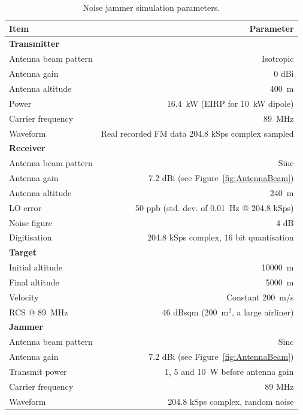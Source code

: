 \documentclass[english, 12pt]{report}
\begin{document}
\begin{table}[ht!]\label{tab:SimulationParameters}
\caption{Noise jammer simulation parameters.}

	\centering
	
	\vspace{1cm}
	\begin{tabu} to \columnwidth { X r }
  		Item 								& Parameter\\
  		\hline
  		\textbf{Transmitter} 				& \\
  		Antenna beam pattern 				& Isotropic\\
  		Antenna gain 						& 0 dBi\\
  		Antenna altitude 					& 400~m\\
  		Power 								& 16.4~kW (EIRP for 10~kW dipole)\\
  		Carrier frequency					& 89~MHz\\
  		Waveform							& Real recorded FM data 204.8 kSps complex sampled\\[3mm]
  		
  		\textbf{Receiver} 					& \\
  		Antenna beam pattern 				& Sinc\\
  		Antenna gain 						& 7.2 dBi (see Figure~\ref{fig:AntennaBeam})\\
  		Antenna altitude					& 240~m\\
  		LO error							& ~50 ppb (std. dev. of 0.01~Hz @ 204.8 kSps)\\
  		Noise figure						& 4 dB\\
  		Digitisation						& 204.8 kSps complex, 16 bit quantisation\\[3mm]

		\textbf{Target} 					& \\
		Initial altitude					& 10000~m\\
		Final altitude						& 5000~m\\
		Velocity							& Constant 200~m/s\\
		RCS @ 89~MHz						& 46 dBsqm (200~m$^2$, a large airliner)\\[3mm]
		
		\textbf{Jammer} 					& \\
		Antenna beam pattern				& Sinc\\
  		Antenna gain 						& 7.2 dBi (see Figure~\ref{fig:AntennaBeam})\\
  		Transmit power						& 1, 5 and 10~W before antenna gain\\
  		Carrier frequency					& 89 MHz\\
  		Waveform							& 204.8 kSps complex, random noise\\[3mm]
  		

\end{tabu}
\end{table}
\end{document}
